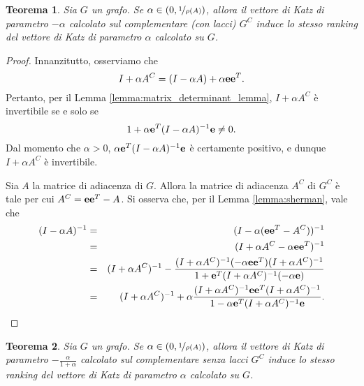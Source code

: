 \documentclass[a4paper]{article}
\newcommand{\evec}{{\bf e}}
\newtheorem{theorem}{Teorema}
\begin{document}
\begin{theorem}
    Sia $G$ un grafo. Se $\alpha \in (0, \nicefrac{1}{\rho(A)})$, allora il vettore di Katz di parametro $-\alpha$ calcolato sul complementare (con lacci) $G^C$
    induce lo stesso ranking del vettore di Katz di parametro $\alpha$ calcolato su $G$.
\end{theorem}

\begin{proof}
    Innanzitutto, osserviamo che
    \[ I+\alpha A^C = (I-\alpha A)+\alpha \evec \evec^T. \]
    Pertanto, per il Lemma \ref{lemma:matrix_determinant_lemma},
    $I + \alpha A^C$ è invertibile se e solo se
    \[ 1 + \alpha \evec^T (I - \alpha A)^{-1} \evec \neq 0. \]
    Dal momento che $\alpha > 0$, $\alpha \evec^T (I - \alpha A)^{-1} \evec$ è certamente positivo, e dunque $I + \alpha A^C$ è invertibile.

    Sia $A$ la matrice di adiacenza di $G$. Allora la matrice di adiacenza
    $A^C$ di $G^C$ è tale per cui $A^C = \evec \evec^T - A$. Si osserva
    che, per il Lemma \ref{lemma:sherman}, vale che
    \begin{eqnarray}
        (I-\alpha A)^{-1}
        &=& (I - \alpha (\evec \evec^T - A^C))^{-1} \nonumber \\
        &=& (I+\alpha A^C-\alpha \evec \evec^T)^{-1} \nonumber \\
        &=& (I + \alpha A^C)^{-1} - \frac{(I + \alpha A^C)^{-1} (-\alpha \evec \evec^T) (I + \alpha A^C)^{-1}}{1 + \evec^T (I + \alpha A^C)^{-1} (-\alpha \evec)} \nonumber \\
        &=& (I + \alpha A^C)^{-1} + \alpha \frac{(I + \alpha A^C)^{-1} \evec \evec^T (I + \alpha A^C)^{-1}}{1 - \alpha \evec^T (I + \alpha A^C)^{-1} \evec}. \nonumber
    \end{eqnarray}
\end{proof}

\begin{theorem}
    Sia $G$ un grafo. Se $\alpha \in (0, \nicefrac{1}{\rho(A)})$, allora il vettore di Katz di parametro $-\frac{\alpha}{1+\alpha}$ calcolato sul complementare senza lacci $G^C$
    induce lo stesso ranking del vettore di Katz di parametro $\alpha$ calcolato su $G$.
\end{theorem}

\printbibliography
\end{document}
